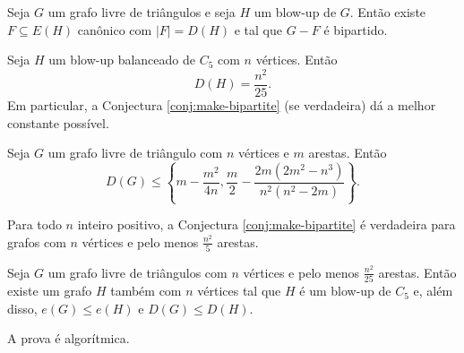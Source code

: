 \begin{theorem}[Simetrização]
  Seja $G$ um grafo livre de triângulos e seja $H$ um blow-up de $G$.
  Então existe $F \subseteq E(H)$ canônico com $|F|=D(H)$ e tal que $G-F$ é bipartido.
\end{theorem}

\begin{corollary}
  Seja $H$ um blow-up balanceado de $C_5$ com $n$ vértices.
  Então \[ D(H) = \frac{n^2}{25}. \]
  Em particular, a Conjectura \ref{conj:make-bipartite} (se verdadeira) dá a melhor constante possível.
\end{corollary}

\begin{theorem}[EFPS] \label{thm:EFPS-bounds}
  Seja $G$ um grafo livre de triângulo com $n$ vértices e $m$ arestas.
  Então \[ D(G) \leq \left\{m-\frac{m^2}{4n}, \frac{m}{2} - \frac{2m(2m^2-n^3)}{n^2(n^2-2m)}\right\}. \]
\end{theorem}

\begin{corollary} \label{cor:n2/5}
  Para todo $n$ inteiro positivo, a Conjectura \ref{conj:make-bipartite}
  é verdadeira para grafos com $n$ vértices e pelo menos $\frac{n^2}{5}$ arestas.
\end{corollary}

\begin{theorem}
  Seja $G$ um grafo livre de triângulos com $n$ vértices e pelo menos $\frac{n^2}{25}$ arestas.
  Então existe um grafo $H$ também com $n$ vértices tal que $H$ é um blow-up de $C_5$ e, além disso,
  $e(G) \leq e(H)$ e $D(G) \leq D(H)$.
\end{theorem}

A prova é algorítmica.